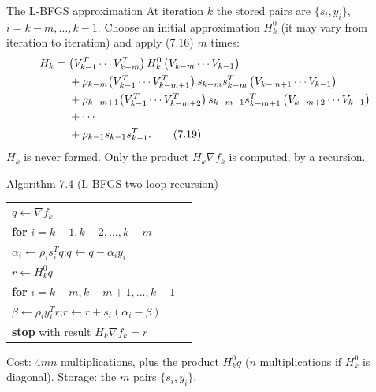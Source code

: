 \documentclass[aspectratio=169,12pt]{beamer}
\makeatletter
\newcommand{\gradf}{\nabla f}
\newcommand{\la}{\leftarrow}
\newenvironment{algo}{\par\renewcommand{\arraystretch}{1.12}%
  \begin{tabular}{@{}l@{\hspace{2.2em}}l@{}}}{\end{tabular}\par}
\makeatother
\begin{document}
\begin{frame}{The L-BFGS approximation}
  At iteration $k$ the stored pairs are $\{s_{i},y_{i}\}$, $i=k-m,\dots,k-1$. Choose an initial
  approximation $H_{k}^{0}$ (it may vary from iteration to iteration) and apply (7.16)
  $m$ times:
  \begin{align}
    H_{k}={}&\big(V_{k-1}^{T}\cdots V_{k-m}^{T}\big)\,H_{k}^{0}\,\big(V_{k-m}\cdots V_{k-1}\big) \notag\\
    &+\rho_{k-m}\big(V_{k-1}^{T}\cdots V_{k-m+1}^{T}\big)\,s_{k-m}s_{k-m}^{T}\,\big(V_{k-m+1}\cdots V_{k-1}\big) \notag\\
    &+\rho_{k-m+1}\big(V_{k-1}^{T}\cdots V_{k-m+2}^{T}\big)\,s_{k-m+1}s_{k-m+1}^{T}\,\big(V_{k-m+2}\cdots V_{k-1}\big) \notag\\
    &+\cdots \notag\\
    &+\rho_{k-1}s_{k-1}s_{k-1}^{T} . \tag{7.19}
  \end{align}
  $H_{k}$ is never formed. Only the product $H_{k}\gradf_{k}$ is computed, by a recursion.
\end{frame}

\begin{frame}{Algorithm 7.4 (L-BFGS two-loop recursion)}
  \begin{block}{}
    \begin{algo}
      $q\la\gradf_{k}$ & \\
      \textbf{for} $i=k-1,k-2,\dots,k-m$ & \\
      \qquad $\alpha_{i}\la\rho_{i}s_{i}^{T}q$;\qquad $q\la q-\alpha_{i}y_{i}$ & \\
      $r\la H_{k}^{0}q$ & \\
      \textbf{for} $i=k-m,k-m+1,\dots,k-1$ & \\
      \qquad $\beta\la\rho_{i}y_{i}^{T}r$;\qquad $r\la r+s_{i}(\alpha_{i}-\beta)$ & \\
      \textbf{stop} with result $H_{k}\gradf_{k}=r$ & \\
    \end{algo}
  \end{block}

  Cost: \alert{$4mn$ multiplications}, plus the product $H_{k}^{0}q$ ($n$ multiplications if $H_{k}^{0}$ is
  diagonal). Storage: the $m$ pairs $\{s_{i},y_{i}\}$.
\end{frame}
\end{document}
